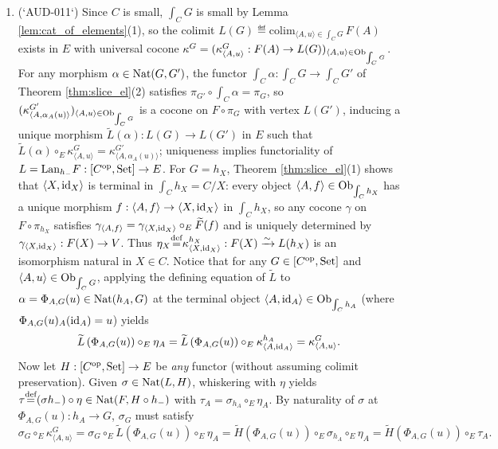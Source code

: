\documentclass[10pt,a4paper]{article}
\begin{document}
\begin{enumerate}
\item (`AUD-011`) Since $C$ is small, $\int_C G$ is small by Lemma \ref{lem:cat_of_elements}(1), so the colimit $L(G) \eqdef \mathrm{colim}_{\langle A, u \rangle \in \int_C G}\, F(A)$ exists in $E$ with universal cocone $\kappa^G = (\kappa^G_{\langle A, u \rangle} : F(A) \to L(G))_{\langle A, u \rangle \in {\textrm{Ob}}_{\int_C G}}$. For any morphism $\alpha \in {\textrm{Nat}}(G, G')$, the functor $\int_C \alpha : \int_C G \to \int_C G'$ of Theorem \ref{thm:slice_el}(2) satisfies $\pi_{G'} \circ \int_C \alpha = \pi_G$, so $(\kappa^{G'}_{\langle A, \alpha_A(u) \rangle})_{\langle A, u \rangle \in {\textrm{Ob}}_{\int_C G}}$ is a cocone on $F \circ \pi_G$ with vertex $L(G')$, inducing a unique morphism $\widetilde{L}(\alpha) : L(G) \to L(G')$ in $E$ such that $\widetilde{L}(\alpha) \circ_E \kappa^G_{\langle A, u \rangle} = \kappa^{G'}_{\langle A, \alpha_A(u) \rangle}$; uniqueness implies functoriality of $L = {\mathrm{Lan}}_{h_-} F : [C^{\textrm{op}}, {\textrm{Set}}] \to E$.
For $G = h_X$, Theorem \ref{thm:slice_el}(1) shows that $\langle X, {\textrm{id}}_X \rangle$ is terminal in $\int_C h_X = C / X$: every object $\langle A, f \rangle \in {\textrm{Ob}}_{\int_C h_X}$ has a unique morphism $f : \langle A, f \rangle \to \langle X, {\textrm{id}}_X \rangle$ in $\int_C h_X$, so any cocone $\gamma$ on $F \circ \pi_{h_X}$ satisfies $\gamma_{\langle A, f \rangle} = \gamma_{\langle X, {\textrm{id}}_X \rangle} \circ_E {\widetilde{F}\textrm{}}(f)$ and is uniquely determined by $\gamma_{\langle X, {\textrm{id}}_X \rangle} : F(X) \to V$. Thus $\eta_X {\stackrel{{\textrm{def}}}{=}} \kappa^{h_X}_{\langle X, {\textrm{id}}_X \rangle} : F(X) \xrightarrow{\sim} L(h_X)$ is an isomorphism natural in $X \in C$.
Notice that for any $G \in [C^{\textrm{op}}, {\textrm{Set}}]$ and $\langle A, u \rangle \in {\textrm{Ob}}_{\int_C G}$, applying the defining equation of $\widetilde{L}$ to $\alpha = \Phi_{A,G}(u) \in {\textrm{Nat}}(h_A, G)$ at the terminal object $\langle A, {\textrm{id}}_A \rangle \in {\textrm{Ob}}_{\int_C h_A}$ (where $\Phi_{A,G}(u)_A({\textrm{id}}_A) = u$) yields
$$\widetilde{L}\left(\Phi_{A,G}(u)\right) \circ_E \eta_A = \widetilde{L}\left(\Phi_{A,G}(u)\right) \circ_E \kappa^{h_A}_{\langle A, {\textrm{id}}_A \rangle} = \kappa^G_{\langle A, u \rangle}.$$
Now let $H : [C^{\textrm{op}}, {\textrm{Set}}] \to E$ be \emph{any} functor (without assuming colimit preservation). Given $\sigma \in {\textrm{Nat}}(L, H)$, whiskering with $\eta$ yields $\tau {\stackrel{{\textrm{def}}}{=}} (\sigma h_-) \circ \eta \in {\textrm{Nat}}(F, H \circ h_-)$ with $\tau_A = \sigma_{h_A} \circ_E \eta_A$. By naturality of $\sigma$ at $\Phi_{A,G}(u) : h_A \to G$, $\sigma_G$ must satisfy
$$\sigma_G \circ_E \kappa^G_{\langle A, u \rangle} = \sigma_G \circ_E \widetilde{L}\left(\Phi_{A,G}(u)\right) \circ_E \eta_A = \widetilde{H}\left(\Phi_{A,G}(u)\right) \circ_E \sigma_{h_A} \circ_E \eta_A = \widetilde{H}\left(\Phi_{A,G}(u)\right) \circ_E \tau_A.$$

\end{enumerate}
\end{document}

